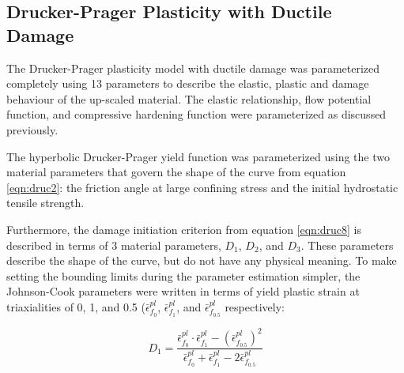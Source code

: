 \subsection{Drucker-Prager Plasticity with Ductile Damage}
The Drucker-Prager plasticity model with ductile damage was parameterized completely using 13 parameters to describe the elastic, plastic and damage behaviour of the up-scaled material. The elastic relationship, flow potential function, and compressive hardening function were parameterized as discussed previously. 

The hyperbolic Drucker-Prager yield function was parameterized using the two material parameters that govern the shape of the curve from equation \ref{eqn:druc2}: the friction angle at large confining stress and the initial hydrostatic tensile strength.




Furthermore, the damage initiation criterion from equation \ref{eqn:druc8} is described in terms of 3 material parameters, $D_1$, $D_2$, and $D_3$. These parameters describe the shape of the curve, but do not have any physical meaning. To make setting the bounding limits during the parameter estimation simpler, the Johnson-Cook parameters were written in terms of yield plastic strain at triaxialities of 0, 1, and 0.5 ($\bar{\epsilon}^{pl}_{f_0}$, $\bar{\epsilon}^{pl}_{f_1}$, and $\bar{\epsilon}^{pl}_{f_0.5}$ respectively:

\begin{equation}
D_1=\frac{\bar{\epsilon}^{pl}_{f_0}\cdot \bar{\epsilon}^{pl}_{f_1}-\left ( \bar{\epsilon}^{pl}_{f_{0.5}} \right )^2}{\bar{\epsilon}^{pl}_{f_0}+ \bar{\epsilon}^{pl}_{f_1}-2\bar{\epsilon}^{pl}_{f_{0.5}}}
\label{eqn:dparam7}
\end{equation}

